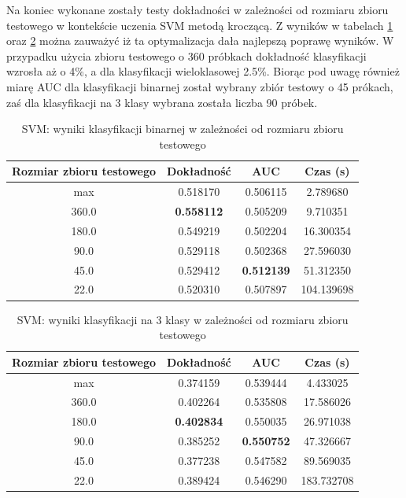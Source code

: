 \documentclass[a4paper, twoside, 11pt, openright]{article}
\begin{document}
Na koniec wykonane zostały testy dokładności w zależności od rozmiaru zbioru testowego w kontekście uczenia SVM metodą kroczącą. Z wyników w tabelach \ref{tab:svm_walk_forward_binary} oraz \ref{tab:svm_walk_forward_discrete} można zauważyć iż ta optymalizacja dała najlepszą poprawę wyników. W przypadku użycia zbioru testowego o 360 próbkach dokładność klasyfikacji wzrosła aż o 4\%, a dla klasyfikacji wieloklasowej 2.5\%. Biorąc pod uwagę również miarę AUC dla klasyfikacji binarnej został wybrany zbiór testowy o 45 prókach, zaś dla klasyfikacji na 3 klasy wybrana została liczba 90 próbek.


\begin{table}[H]
    \centering
    \begin{tabular}{|c|c|c|c|}
    \hline
        \textbf{Rozmiar zbioru testowego} & \textbf{Dokładność} & \textbf{AUC} & \textbf{Czas (s)} \\ \hline
max                        &   0.518170 &  0.506115 &    2.789680 \\ \hline
360.0                         &  \textbf{0.558112} &  0.505209 &    9.710351 \\ \hline
180.0                         &  0.549219 &  0.502204 &   16.300354 \\ \hline
90.0                          &  0.529118 &  0.502368 &   27.596030 \\ \hline
45.0                          &  0.529412 &  \textbf{0.512139} &   51.312350 \\ \hline
22.0                          &  0.520310 &  0.507897 &  104.139698 \\ \hline

    \end{tabular}
    \caption{SVM: wyniki klasyfikacji binarnej w zależności od rozmiaru zbioru testowego}
    \label{tab:svm_walk_forward_binary}
\end{table}



\begin{table}[H]
    \centering
    \begin{tabular}{|c|c|c|c|}
    \hline
        \textbf{Rozmiar zbioru testowego} & \textbf{Dokładność} & \textbf{AUC} & \textbf{Czas (s)} \\ \hline
max                       &  0.374159 &  0.539444 &    4.433025 \\ \hline
360.0                         &  0.402264 &  0.535808 &   17.586026 \\ \hline
180.0                         &  \textbf{0.402834} &  0.550035 &   26.971038 \\ \hline
90.0                          &  0.385252 &  \textbf{0.550752} &   47.326667 \\ \hline
45.0                          &  0.377238 &  0.547582 &   89.569035 \\ \hline
22.0                          &  0.389424 &  0.546290 &  183.732708 \\ \hline
    \end{tabular}
    \caption{SVM: wyniki klasyfikacji na 3 klasy w zależności od rozmiaru zbioru testowego}
    \label{tab:svm_walk_forward_discrete}
\end{table}
    
\end{document}
